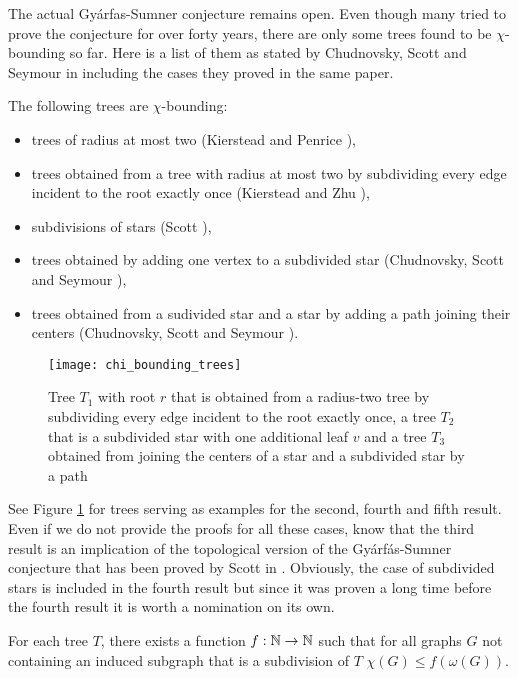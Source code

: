 The actual Gyárfas-Sumner conjecture remains open. Even though many tried to prove the conjecture for over forty years, there are only some trees found to be $\chi$-bounding so far. Here is a list of them as stated by Chudnovsky, Scott and Seymour in \cite{CSS17} including the cases they proved in the same paper.

\begin{thm}\label{t3cr}
The following trees are $\chi$-bounding:
\begin{itemize}
\item trees of radius at most two (Kierstead and Penrice \cite{Ki94}),
\item trees obtained from a tree with radius at most two by subdividing every edge incident to the root exactly once (Kierstead and Zhu \cite{Ki04}),
\item subdivisions of stars (Scott \cite{Sc97}),
\item trees obtained by adding one vertex to a subdivided star (Chudnovsky, Scott and Seymour \cite{CSS17}),
\item trees obtained from a sudivided star and a star by adding a path joining their centers (Chudnovsky, Scott and Seymour \cite{CSS17}).
\end{itemize} 
\end{thm}

\begin{figure}[ht]
\begin{center}
\texttt{[image: chi\_bounding\_trees]}
\end{center}
\caption{Tree $T_1$ with root $r$ that is obtained from a radius-two tree by subdividing every edge incident to the root exactly once, a tree $T_2$ that is a subdivided star with one additional leaf $v$ and a tree $T_3$ obtained from joining the centers of a star and a subdivided star by a path}
\label{f2cr}
\end{figure}

See Figure \ref{f2cr} for trees serving as examples for the second, fourth and fifth result. Even if we do not provide the proofs for all these cases, know that the third result is an implication of the topological version of the Gyárfás-Sumner conjecture that has been proved by Scott in \cite{Sc97}. Obviously, the case of subdivided stars is included in the fourth result but since it was proven a long time before the fourth result it is worth a nomination on its own.

\begin{thm}
For each tree $T$, there exists a function $f:\mathbb{N}\to\mathbb{N}$ such that for all graphs $G$ not containing an induced subgraph that is a subdivision of $T$ $\chi (G)\leq f(\omega (G))$.
\end{thm}

